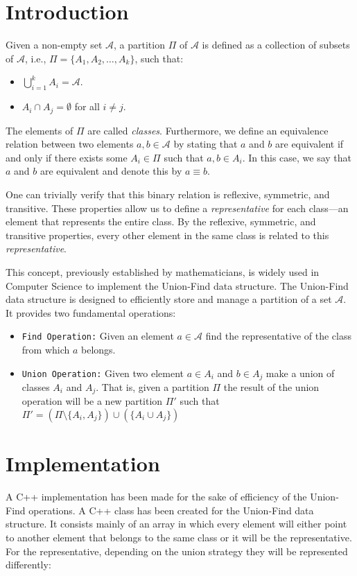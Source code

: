 \section{Introduction}
Given a non-empty set $\mathcal{A}$, a partition $\Pi$ of $\mathcal{A}$ is defined as a collection of subsets of $\mathcal{A}$, i.e., $\Pi = \{A_1, A_2, \ldots, A_k\}$, such that:

\begin{itemize}
    \item $\bigcup\limits_{i = 1}^{k} A_i = \mathcal{A}$.
    \item $A_i \cap A_j = \emptyset$ for all $i \neq j$.
\end{itemize}

The elements of $\Pi$ are called \textit{classes}. Furthermore, we define an equivalence relation between two elements $a, b \in \mathcal{A}$ by stating that $a$ and $b$ are equivalent if and only if there exists some $A_i \in \Pi$ such that $a, b \in A_i$. In this case, we say that $a$ and $b$ are equivalent and denote this by $a \equiv b$.

One can trivially verify that this binary relation is reflexive, symmetric, and transitive. These properties allow us to define a \textit{representative} for each class—an element that represents the entire class. By the reflexive, symmetric, and transitive properties, every other element in the same class is related to this \textit{representative}.

This concept, previously established by mathematicians, is widely used in Computer Science to implement the Union-Find data structure. The Union-Find data structure is designed to efficiently store and manage a partition of a set $\mathcal{A}$. It provides two fundamental operations:

\begin{itemize}
    \item \texttt{Find Operation:} Given an element $a \in \mathcal{A}$ find the representative of the class from which $a$ belongs.
    \item \texttt{Union Operation:} Given two element $a \in A_i$ and $b \in A_j$ make a union of classes $A_i$ and $A_j$. That is, given a partition $\Pi$ the result of the union operation will be a new partition $\Pi'$ such that $\Pi' =  (\Pi \setminus \{A_i,A_j\}) \cup (\{A_i \cup A_j\})$
\end{itemize}

\section{Implementation}
A C++ implementation has been made for the sake of efficiency of the Union-Find operations. A C++ class has been created for the Union-Find data structure. It consists mainly of an array in which every element will either point to another element that belongs to the same class or it will be the representative. For the representative, depending on the union strategy they will be represented differently:


